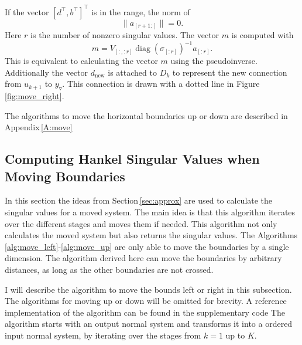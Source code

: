 \documentclass[doctype=mastersthesis,BCOR=15mm,biblatex]{ldvbook}%
\DeclareMathOperator{\diag}{diag}
\newcommand{\m}{\triangledown} %
\begin{document}
If the vector $[d^\top,b^\top]^\top$ is in the range, the norm of 
\begin{equation}
	\|a_{[r+1:]} \| = 0
	.
\end{equation}
Here $r$ is the number of nonzero singular values.
The vector $m$ is computed with 
\begin{equation}
	m = V_{[:,:r]} \diag(\sigma_{[:r]})^{-1} a_{[:r]}
	.
\end{equation}
This is equivalent to calculating the vector $m$ using the pseudoinverse.  
Additionally the vector $d_\text{new}$ is attached to $D_k$ to represent the new connection from $u_{k+1}$ to $y_\m$.
This connection is drawn with a dotted line in Figure\,\ref{fig:move_right}.

The algorithms to move the horizontal boundaries up or down are described in Appendix\,\ref{A:move}

\FloatBarrier
\subsection{Computing Hankel Singular Values when Moving Boundaries}\label{subsec:move_sig}
In this section the ideas from Section\,\ref{sec:approx} are used to calculate the singular values for a moved system.
The main idea is that this algorithm iterates over the different stages and moves them if needed.
This algorithm not only calculates the moved system but also returns the singular values.
The Algorithms\,\ref{alg:move_left}-\ref{alg:move_up} are only able to move the boundaries by a single dimension.
The algorithm derived here can move the boundaries by arbitrary distances, as long as the other boundaries are not crossed. 


I will describe the algorithm to move the bounds left or right in this subsection. The algorithms for moving up or down will be omitted for brevity.
A reference implementation of the algorithm can be found in the supplementary code 
The algorithm starts with an output normal system and transforms it into a ordered input normal system, by iterating over the stages from $k=1$ up to $K$.
\end{document}
